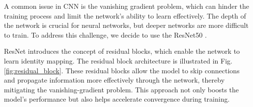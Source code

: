\documentclass[conference]{IEEEtran}
\begin{document}


A common issue in CNN is the vanishing gradient problem, which can hinder the training process and limit the network's ability to learn effectively. The depth of the network is crucial for neural networks, but deeper networks are more difficult to train. To address this challenge, we decide to use the ResNet50 \cite{he2015deep}.


ResNet\cite{wang2017residual} introduces the concept of residual blocks, which enable the network to learn identity mapping. The residual block architecture is illustrated in Fig. \ref{fig:residual_block}. These residual blocks allow the model to skip connections and propagate information more effectively through the network, thereby mitigating the vanishing-gradient problem. This approach not only boosts the model's performance but also helps accelerate convergence during training.


\end{document}

